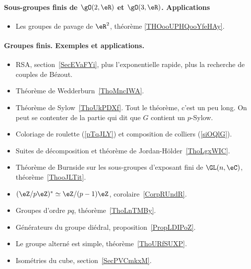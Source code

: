 \paragraph{Sous-groupes finis de \( \gO(2,\eR)\) et \( \gO(3,\eR)\). Applications}
\begin{itemize}
    \item Les groupes de pavage de \( \eR^2\), théorème \ref{THOooUPHQooYfeHAy}.
\end{itemize}
\paragraph{Groupes finis. Exemples et applications.}
\begin{itemize}
    \item RSA, section~\ref{SecEVaFYi}, plus l'exponentielle rapide, plus la recherche de couples de Bézout.
    \item Théorème de Wedderburn~\ref{ThoMncIWA}.
    \item Théorème de Sylow~\ref{ThoUkPDXf}. Tout le théorème, c'est un peu long. On peut se contenter de la partie qui dit que \( G\) contient un \( p\)-Sylow.
    \item Coloriage de roulette (\ref{pTqJLY}) et composition de colliers (\ref{siOQlG}).
    \item Suites de décomposition et théorème de Jordan-Hölder~\ref{ThoLgxWIC}.
    \item Théorème de Burnside sur les sous-groupes d'exposant fini de \( \GL(n,\eC)\), théorème~\ref{ThooJLTit}.
    \item \( (\eZ/p\eZ)^*\simeq \eZ/(p-1)\eZ\), corolaire~\ref{CorpRUndR}.
    \item Groupes d'ordre \( pq\), théorème~\ref{ThoLnTMBy}.
    \item Générateurs du groupe diédral, proposition~\ref{PropLDIPoZ}.
    \item Le groupe alterné est simple, théorème~\ref{ThoURfSUXP}.
    \item Isométries du cube, section~\ref{SecPVCmkxM}.
\end{itemize}
